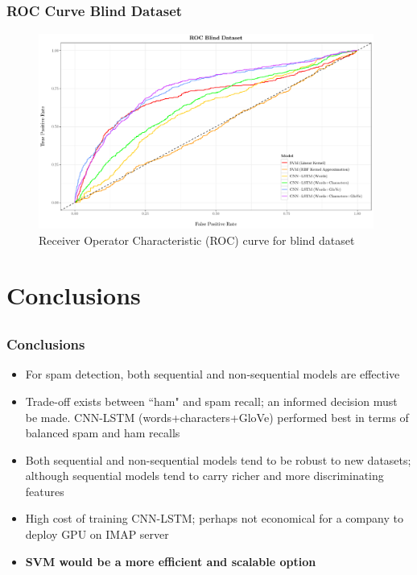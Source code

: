 \documentclass{beamer}
\begin{document}
\subsection{}
\begin{framefont}{\footnotesize}
	\begin{frame}
		\frametitle{ROC Curve Blind Dataset}
		\begin{figure}
			\captionsetup{justification=centering}
			\includegraphics[width=11cm]{roc_blind.pdf}
			\caption{Receiver Operator Characteristic (ROC) curve for blind dataset}
		\end{figure}
	\end{frame}
\end{framefont}

\section{Conclusions}
\subsection{}
\begin{framefont}{\footnotesize}
	\begin{frame}
		\frametitle{Conclusions}
		\begin{itemize}
			\setlength\itemsep{1.2em}
			\item For spam detection, both sequential and non-sequential models are effective
			\item Trade-off exists between ``ham" and spam recall; an informed decision must be made. CNN-LSTM (words+characters+GloVe) performed best in terms of balanced spam and ham recalls
			\item Both sequential and non-sequential models tend to be robust to new datasets; although sequential models tend to carry richer and more discriminating features
			\item High cost of training CNN-LSTM; perhaps not economical for a company to deploy GPU on IMAP server
			\item \textbf{SVM would be a more efficient and scalable option}
		\end{itemize}
	\end{frame}
\end{framefont}
\end{document}
